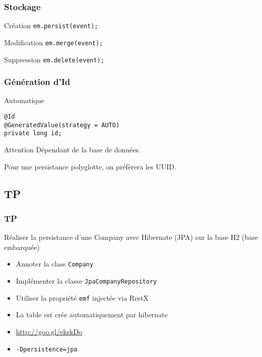 \documentclass[t,12pt]{beamer}
\begin{document}
\begin{frame}
	\frametitle{Stockage}

	\begin{exampleblock}{Cr\'eation}
		\lstinline{em.persist(event);}
	\end{exampleblock}

	\begin{block}{Modification}
		\lstinline{em.merge(event);}
	\end{block}

	\begin{alertblock}{Suppression}
		\lstinline{em.delete(event);}
	\end{alertblock}
\end{frame}

\begin{frame}[fragile]
	\frametitle{G\'en\'eration d'Id}

	\begin{block}{Automatique}
		\begin{lstlisting}[frame=none]
@Id
@GeneratedValue(strategy = AUTO)
private long id;
		\end{lstlisting}
	\end{block}

	\begin{alertblock}{Attention}
		D\'ependant de la base de donn\'ees.

		Pour une persistance polyglotte, on pr\'ef\`erera les UUID.
	\end{alertblock}
\end{frame}

\subsection{TP}

\begin{frame}
	\frametitle{TP}

	\begin{block}{R\'ealiser la persistance d'une Company avec Hibernate (JPA) sur la base H2 (base embarqu\'ee)}
		\begin{itemize}
			\item Annoter la class \lstinline{Company}
			\item Impl\'ementer la classe \lstinline{JpaCompanyRepository}
			\item Utiliser la propri\'et\'e \lstinline{emf} inject\'ee via RestX
			\item La table est cr\'ee automatiquement par hibernate
			\item \url{http://goo.gl/ekskDo}
			\item \lstinline{-Dpersistence=jpa}
		\end{itemize}
	\end{block}
\end{frame}
\end{document}

